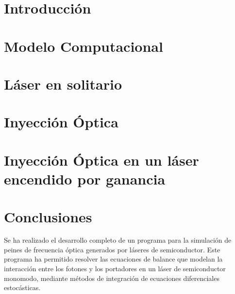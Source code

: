 \documentclass[a4paper, 11pt, oneside]{book}
\newcommand{\gs}{encendido por ganancia}
\begin{document}
			\chapter{Introducción} %
				\label{Intr}

				
				
			\chapter{Modelo Computacional}
				\label{Mdl}

				

			\chapter{Láser en solitario}
				\label{Sol}

					

			\chapter{Inyecci\'on Óptica}

				

			\chapter{Inyecci\'on Óptica en un láser \gs}

				

			\chapter{Conclusiones}

				Se ha realizado el desarrollo completo de un programa para la simulación de peines de frecuencia \'optica generados por l\'aseres de semiconductor. Este programa ha permitido resolver las ecuaciones de balance que modelan la interacci\'on entre los fotones y los portadores en un l\'aser de semiconductor monomodo, mediante m\'etodos de integraci\'on de ecuaciones diferenciales estoc\'asticas.
\end{document}
